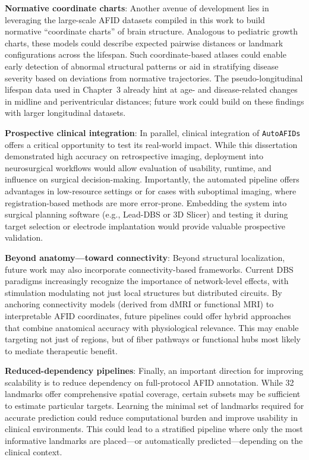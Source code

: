\textbf{Normative coordinate charts}: Another avenue of development lies in leveraging the large-scale AFID datasets compiled in this work to build normative “coordinate charts” of brain structure. Analogous to pediatric growth charts, these models could describe expected pairwise distances or landmark configurations across the lifespan. Such coordinate-based atlases could enable early detection of abnormal structural patterns or aid in stratifying disease severity based on deviations from normative trajectories. The pseudo-longitudinal lifespan data used in Chapter~3 already hint at age- and disease-related changes in midline and periventricular distances; future work could build on these findings with larger longitudinal datasets.

\textbf{Prospective clinical integration}: In parallel, clinical integration of \texttt{AutoAFIDs} offers a critical opportunity to test its real-world impact. While this dissertation demonstrated high accuracy on retrospective imaging, deployment into neurosurgical workflows would allow evaluation of usability, runtime, and influence on surgical decision-making. Importantly, the automated pipeline offers advantages in low-resource settings or for cases with suboptimal imaging, where registration-based methods are more error-prone. Embedding the system into surgical planning software (e.g., Lead-DBS or 3D Slicer) and testing it during target selection or electrode implantation would provide valuable prospective validation. 

\textbf{Beyond anatomy—toward connectivity}: Beyond structural localization, future work may also incorporate connectivity-based frameworks. Current DBS paradigms increasingly recognize the importance of network-level effects, with stimulation modulating not just local structures but distributed circuits. By anchoring connectivity models (derived from dMRI or functional MRI) to interpretable AFID coordinates, future pipelines could offer hybrid approaches that combine anatomical accuracy with physiological relevance. This may enable targeting not just of regions, but of fiber pathways or functional hubs most likely to mediate therapeutic benefit.

\textbf{Reduced-dependency pipelines}: Finally, an important direction for improving scalability is to reduce dependency on full-protocol AFID annotation. While 32 landmarks offer comprehensive spatial coverage, certain subsets may be sufficient to estimate particular targets. Learning the minimal set of landmarks required for accurate prediction could reduce computational burden and improve usability in clinical environments. This could lead to a stratified pipeline where only the most informative landmarks are placed—or automatically predicted—depending on the clinical context.

